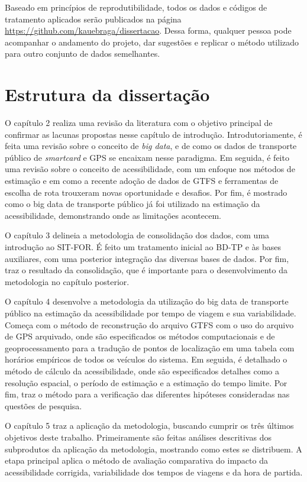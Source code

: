 \documentclass[        
    a4paper,          %
    12pt,             %
    chapter=TITLE,    %
    section=Title,    %
    subsection=Title, %
    oneside,          %
    english,          %
    spanish,          %
    brazil,           %
    fleqn             %
]{abntex2}
\begin{document}
  Baseado em princípios de reprodutibilidade, todos os dados e códigos de tratamento aplicados serão publicados na página \url{https://github.com/kauebraga/dissertacao}. Dessa forma, qualquer pessoa pode acompanhar o andamento do projeto, dar sugestões e replicar o método utilizado para outro conjunto de dados semelhantes.
  
  \hypertarget{estrutura-da-dissertacao}{%
  \section{Estrutura da dissertação}\label{estrutura-da-dissertacao}}
  
  O capítulo 2 realiza uma revisão da literatura com o objetivo principal de confirmar as lacunas propostas nesse capítulo de introdução. Introdutoriamente, é feita uma revisão sobre o conceito de \emph{big data}, e de como os dados de transporte público de \emph{smartcard} e GPS se encaixam nesse paradigma. Em seguida, é feito uma revisão sobre o conceito de acessibilidade, com um enfoque nos métodos de estimação e em como a recente adoção de dados de GTFS e ferramentas de escolha de rota trouxeram novas oportunidade e desafios. Por fim, é mostrado como o big data de transporte público já foi utilizado na estimação da acessibilidade, demonstrando onde as limitações acontecem.
  
  O capítulo 3 delineia a metodologia de consolidação dos dados, com uma introdução ao SIT-FOR. É feito um tratamento inicial ao BD-TP e às bases auxiliares, com uma posterior integração das diversas bases de dados. Por fim, traz o resultado da consolidação, que é importante para o desenvolvimento da metodologia no capítulo posterior.
  
  O capítulo 4 desenvolve a metodologia da utilização do big data de transporte público na estimação da acessibilidade por tempo de viagem e sua variabilidade. Começa com o método de reconstrução do arquivo GTFS com o uso do arquivo de GPS arquivado, onde são especificados os métodos computacionais e de geoprocessamento para a tradução de pontos de localização em uma tabela com horários empíricos de todos os veículos do sistema. Em seguida, é detalhado o método de cálculo da acessibilidade, onde são especificados detalhes como a resolução espacial, o período de estimação e a estimação do tempo limite. Por fim, traz o método para a verificação das diferentes hipóteses consideradas nas questões de pesquisa.
  
  O capítulo 5 traz a aplicação da metodologia, buscando cumprir os três últimos objetivos deste trabalho. Primeiramente são feitas análises descritivas dos subprodutos da aplicação da metodologia, mostrando como estes se distribuem. A etapa principal aplica o método de avaliação comparativa do impacto da acessibilidade corrigida, variabilidade dos tempos de viagens e da hora de partida.
  
\end{document}
